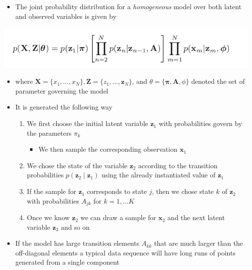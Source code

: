 \documentclass[11pt]{article}
\begin{document}
\begin{itemize}
\item The joint probability distribution for a \emph{homogeneous} model over both latent and observed variables is given by
\end{itemize}
\begin{center}
\includegraphics[width=.9\linewidth]{Sequential Data/screenshot_2018-10-29_16-55-53.png}
\end{center}
\begin{itemize}
\item where \(\pmb X = \{x_1, \dots, x_N\}, \pmb Z = \{z_1, \dots, \pmb z_N\}\), and \(\theta = \{\pmb \pi, \pmb A, \phi \}\) denoted the set of parameter governing the model

\item It is generated the following way
\begin{enumerate}
\item We first choose the initial latent variable \(\pmb z_1\) with probabilities govern by the parameters \(\pi_k\)
\begin{itemize}
\item We then sample the corresponding observation \(\pmb x_1\)
\end{itemize}
\item We chose the state of the variable \(\pmb z_2\) according to the transition probabilities \(p(\pmb z_2 \mid \pmb z_1)\) using the already instantiated value of \(\pmb z_1\)
\item If the sample for \(\pmb z_1\) corresponds to state \(j\), then we chose state \(k\) of \(\pmb z_2\) with probabilities \(A_{jk}\) for \(k=1,\dots K\)
\item Once we know \(\pmb z_2\) we can draw a sample for \(\pmb x_2\) and the next latent variable \(\pmb z_3\) and so on
\end{enumerate}

\item If the model has large transition elements \(A_{kk}\) that are much larger than the off-diagonal elements a typical data sequence will have long runs of points generated from a single component


\end{itemize}
\end{document}
